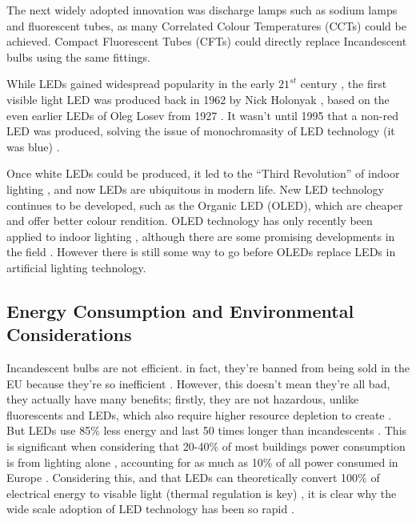 The next widely adopted innovation was discharge lamps such as sodium lamps and fluorescent tubes, as many Correlated Colour Temperatures (CCTs) could be achieved. Compact Fluorescent Tubes (CFTs) could directly replace Incandescent bulbs using the same fittings.

While LEDs gained widespread popularity in the early $21^{st}$ century \citep{matsumotoMeasuringHouseholdAbility2020}, the first visible light LED was produced back in 1962 by Nick Holonyak \citep{holonyakCOHERENTVISIBLELIGHT1962}, based on the even earlier LEDs of Oleg Losev from 1927 \citep{zheludevLifeTimesLED2007}. It wasn't until 1995 that a non-red LED was produced, solving the issue of monochromasity of LED technology (it was blue) \citep{nakamuraInGaNAlGaNBlue1995}.

Once white LEDs could be produced, it led to the ``Third Revolution'' of indoor lighting \citep{montoyaIndoorLightingTechniques2017a}, and now LEDs are ubiquitous in modern life. New LED technology continues to be developed, such as the Organic LED (OLED), which are cheaper and offer better colour rendition. OLED technology has only recently been applied to indoor lighting \citep{phelanOLEDLightingHits2018}, although there are some promising developments in the field \citep{benderSolidStateLightingConcise2015}. However there is still some way to go before OLEDs replace LEDs in artificial lighting technology.

\subsection{Energy Consumption and Environmental Considerations}
\label{sec:Energy}

Incandescent bulbs are not efficient. in fact, they're banned from being sold in the EU because they're so inefficient \citep{Directive201227}. However, this doesn't mean they're all bad, they actually have many benefits; firstly, they are not hazardous, unlike fluorescents and LEDs, which also require higher resource depletion to create \citep{PotentialEnvironmentalImpacts}. But LEDs use 85\% less energy and last 50 times longer than incandescents \citep{mottierLEDLightingApplications2010}. This is significant when considering that 20-40\% of most buildings power consumption is from lighting alone \citep{perez-lombardReviewBuildingsEnergy2008}, accounting for as much as 10\% of all power consumed in Europe \citep{bertoldiEnergyEfficiencyStatus2012}. Considering  this, and that LEDs can theoretically convert 100\% of electrical energy to visable light (thermal regulation is key) \citep{jordanChallengesLEDPackaging2012}, it is clear why the wide scale adoption of LED technology has been so rapid \citep{matsumotoMeasuringHouseholdAbility2020}.



